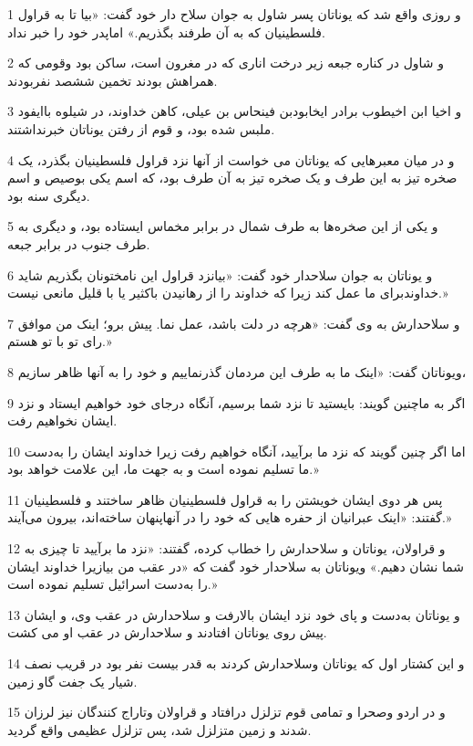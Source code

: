 \par 1 و روزی واقع شد که یوناتان پسر شاول به جوان سلاح دار خود گفت: «بیا تا به قراول فلسطینیان که به آن طرفند بگذریم.» اماپدر خود را خبر نداد.
\par 2 و شاول در کناره جبعه زیر درخت اناری که در مغرون است، ساکن بود وقومی که همراهش بودند تخمین ششصد نفربودند.
\par 3 و اخیا ابن اخیطوب برادر ایخابودبن فینحاس بن عیلی، کاهن خداوند، در شیلوه باایفود ملبس شده بود، و قوم از رفتن یوناتان خبرنداشتند.
\par 4 و در میان معبرهایی که یوناتان می خواست از آنها نزد قراول فلسطینیان بگذرد، یک صخره تیز به این طرف و یک صخره تیز به آن طرف بود، که اسم یکی بوصیص و اسم دیگری سنه بود.
\par 5 و یکی از این صخره‌ها به طرف شمال در برابر مخماس ایستاده بود، و دیگری به طرف جنوب در برابر جبعه.
\par 6 و یوناتان به جوان سلاحدار خود گفت: «بیانزد قراول این نامختونان بگذریم شاید خداوندبرای ما عمل کند زیرا که خداوند را از رهانیدن باکثیر یا با قلیل مانعی نیست.»
\par 7 و سلاحدارش به وی گفت: «هر‌چه در دلت باشد، عمل نما. پیش برو؛ اینک من موافق رای تو با تو هستم.»
\par 8 ویوناتان گفت: «اینک ما به طرف این مردمان گذرنماییم و خود را به آنها ظاهر سازیم،
\par 9 اگر به ماچنین گویند: بایستید تا نزد شما برسیم، آنگاه درجای خود خواهیم ایستاد و نزد ایشان نخواهیم رفت.
\par 10 اما اگر چنین گویند که نزد ما برآیید، آنگاه خواهیم رفت زیرا خداوند ایشان را به‌دست ما تسلیم نموده است و به جهت ما، این علامت خواهد بود.»
\par 11 پس هر دوی ایشان خویشتن را به قراول فلسطینیان ظاهر ساختند و فلسطینیان گفتند: «اینک عبرانیان از حفره هایی که خود را در آنهاپنهان ساخته‌اند، بیرون می‌آیند.»
\par 12 و قراولان، یوناتان و سلاحدارش را خطاب کرده، گفتند: «نزد ما برآیید تا چیزی به شما نشان دهیم.» ویوناتان به سلاحدار خود گفت که «در عقب من بیازیرا خداوند ایشان را به‌دست اسرائیل تسلیم نموده است.»
\par 13 و یوناتان به‌دست و پای خود نزد ایشان بالارفت و سلاحدارش در عقب وی، و ایشان پیش روی یوناتان افتادند و سلاحدارش در عقب او می کشت.
\par 14 و این کشتار اول که یوناتان وسلاحدارش کردند به قدر بیست نفر بود در قریب نصف شیار یک جفت گاو زمین.
\par 15 و در اردو وصحرا و تمامی قوم تزلزل در‌افتاد و قراولان وتاراج کنندگان نیز لرزان شدند و زمین متزلزل شد، پس تزلزل عظیمی واقع گردید.
